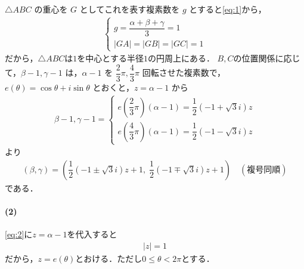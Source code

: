 \documentclass[../../main.tex]{subfiles}
\begin{document}
$\triangle ABC$ の重心を $G$ としてこれを表す複素数を $g$ とすると\cref{eq:1}から，
\begin{align}
  \begin{cases}
    g = \dfrac{\alpha + \beta + \gamma}{3} = 1 \\
    |GA|=|GB|=|GC|=1
  \end{cases} \label{eq:2}
\end{align}
だから，$\triangle ABC$は$1$を中心とする半径$1$の円周上にある．
$B,C$の位置関係に応じて，$\beta - 1, \gamma - 1$ は，$\alpha - 1$ を $\dfrac{2}{3}\pi, \dfrac{4}{3}\pi$ 回転させた複素数で，$e(\theta) = \cos \theta + i \sin \theta$ とおくと，$z = \alpha - 1$ から
\begin{align}
  \beta-1, \gamma-1 =
  \begin{cases}
    e\left(\dfrac{2}{3}\pi\right) (\alpha - 1) = \dfrac{1}{2}(-1 + \sqrt{3}i)z \\
    e\left(\dfrac{4}{3}\pi\right) (\alpha - 1) = \dfrac{1}{2}(-1 - \sqrt{3}i)z
  \end{cases}
\end{align}
より
\begin{align}
  (\beta, \gamma) = \left( \dfrac{1}{2}(-1 \pm \sqrt{3}i)z + 1 , \; \dfrac{1}{2}(-1 \mp \sqrt{3}i)z + 1 \right) \quad (\text{複号同順}) \label{eq:3}
\end{align}
である．

\paragraph{(2)}

\cref{eq:2}に$z=\alpha-1$を代入すると
\begin{align}
  |z|=1 \label{eq:4}
\end{align}
だから，$z=e(\theta)$とおける．ただし$0 \le \theta < 2\pi$とする．
\end{document}
